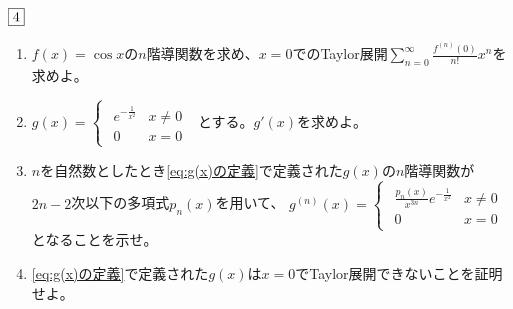 \documentclass[dvipdfmx]{jsreport}
\begin{document}
\begin{tcolorbox} %
	$\fbox{4}$
\begin{enumerate}
	\item $f(x)= \cos{x}$の$n$階導関数を求め、$x= 0$でのTaylor展開$\sum_{n= 0}^\infty \frac{f^{(n)}(0)}{n!}x^n$を求めよ。
	\item\label{eq:g(x)の定義} $
	g(x)= 
\begin{cases}
\begin{matrix}
	e^{-\frac{1}{x^2}}& x\ne 0\\
	0& x= 0
\end{matrix}
\end{cases}
$
	とする。$g'(x)$を求めよ。
	\item $n$を自然数としたとき\eqref{eq:g(x)の定義}で定義された$g(x)$の$n$階導関数が$2n- 2$次以下の多項式$p_n(x)$を用いて、
$
	g^{(n)}(x)=
\begin{cases}
\begin{matrix}
	\frac{p_n(x)}{x^{3n}}e^{-\frac{1}{x^2}}& x\ne 0\\
	0& x= 0
\end{matrix}
\end{cases}
$
	となることを示せ。
	\item \eqref{eq:g(x)の定義}で定義された$g(x)$は$x= 0$でTaylor展開できないことを証明せよ。
\end{enumerate}
\end{tcolorbox}
\end{document}

